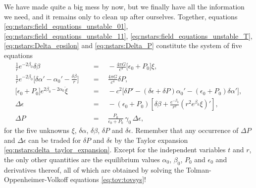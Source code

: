 We have made quite a big mess by now, but we finally have all the information we need, and it remains only to clean up after ourselves.
Together, equations \eqref{eq:nstars:field_equations_unstable_01}, \eqref{eq:nstars:field_equations_unstable_11}, \eqref{eq:nstars:field_equations_unstable_T}, \eqref{eq:nstars:Delta_epsilon} and \eqref{eq:nstars:Delta_P} constitute the system of five equations
\begin{subequations}
\begin{align}
	\frac{1}{r} e^{-2\beta_0} \delta\beta                                                                                & \quad = \quad -           \frac{4 \pi G}{c^4} \Big[ \epsilon_0 + P_0 \Big] \xi , \label{eq:nstars:perturbation_system_01} \\[1.0ex]
	\frac{1}{r} e^{-2\beta_0} \Big[ \delta\alpha' - \alpha_0' - \frac{\delta \beta}{r} \Big]                             & \quad = \quad \frac{4 \pi G}{c^4} \delta P               , \label{eq:nstars:perturbation_system_11} \\[1.0ex]
	\Big[ \epsilon_0 + P_0 \Big] e^{2 \beta_0 - 2 \alpha_0} \ddot \xi                                                    & \quad = \quad -c^2 \Big[ \delta P' - \left( \delta \epsilon + \delta P \right) \alpha_0' - \left( \epsilon_0 + P_0 \right) \delta \alpha' \Big] , \label{eq:nstars:perturbation_system_euler} \\[1.0ex]
	\Delta \epsilon                                                                                                      & \quad = \quad - \left( \epsilon_0 + P_0 \right) \left[ \delta\beta + \frac{e^{-\beta_0}}{r^2} \left( r^2 e^{\beta_0} \xi \right)' \right]  , \label{eq:nstars:perturbation_system_energy_conservation} \\[1.0ex]
	\Delta P                                                                                                             & \quad = \quad \frac{P_0}{\epsilon_0 + P_0} \, \gamma_0 \, \Delta \epsilon , \label{eq:nstars:perturbation_system_adiabadicity}
\end{align}%
\label{eq:nstars:perturbation_system}%
\end{subequations}%
for the five unknowns $\xi$, $\delta \alpha$, $\delta \beta$, $\delta P$ and $\delta \epsilon$.
Remember that any occurrence of $\Delta P$ and $\Delta \epsilon$ can be traded for $\delta P$ and $\delta \epsilon$ by the Taylor expansion \eqref{eq:nstars:delta_taylor_expansion}.
Except for the independent variables $t$ and $r$, the only other quantities are the equilibrium values $\alpha_0$, $\beta_0$, $P_0$ and $\epsilon_0$ and derivatives thereof, all of which are obtained by solving the Tolman-Oppenheimer-Volkoff equations \eqref{eq:tov:tovsys}!

